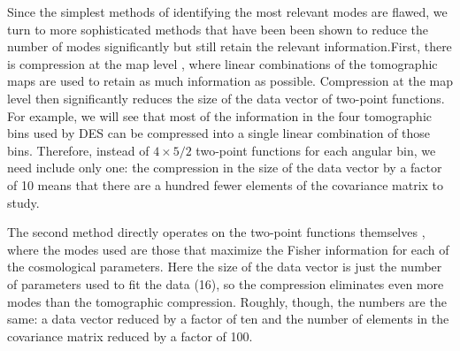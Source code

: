\documentclass[twocolumn]{\docclass}
\def\bea{\begin{eqnarray}}
\def\eea{\end{eqnarray}}
\begin{document}
	Since the simplest methods of identifying the most relevant modes are flawed, we turn to more sophisticated methods \citep{Tegmark:1997maa, Joachimi:2017mnr,Gualdi:2018gmj} that have been been shown to reduce the number of modes significantly but still retain the relevant information.First, there is compression at the map level \citep{Alonso:2017hhj}, where linear combinations of the tomographic maps are used to retain as much information as possible. Compression at the map level then significantly reduces the size of the data vector of two-point functions. For example, we will see that most of the information in the four tomographic bins used by DES can be compressed into a single linear combination of those bins. Therefore, instead of $4\times5/2$ two-point functions for each angular bin, we need include only one: the compression in the size of the data vector by a factor of 10 means that there are a hundred fewer elements of the covariance matrix to study.
	
	The second method directly operates on the two-point functions themselves \citep{Zablocki:2015zcm}, where the modes used are those that maximize the Fisher information for each of the cosmological parameters. Here the size of the data vector is just the number of parameters used to fit the data (16), so the compression eliminates even more modes than the tomographic compression. Roughly, though, the numbers are the same: a data vector reduced by a factor of ten and the number of elements in the covariance matrix reduced by a factor of 100.
	
%	
	
\end{document}
